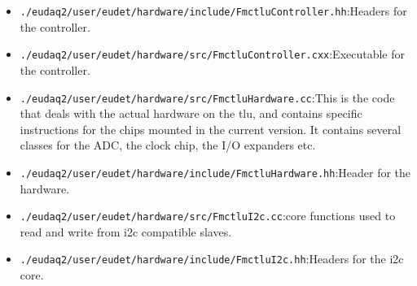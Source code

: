 \begin{itemize}
  \item \verb|./eudaq2/user/eudet/hardware/include/FmctluController.hh|:\newline Headers for the controller.
  \item \verb|./eudaq2/user/eudet/hardware/src/FmctluController.cxx|:\newline Executable for the controller.
  \item \verb|./eudaq2/user/eudet/hardware/src/FmctluHardware.cc|:\newline This is the code that deals with the actual hardware on the \gls{tlu}, and contains specific instructions for the chips mounted in the current version. It contains several classes for the ADC, the clock chip, the I/O expanders etc.
  \item \verb|./eudaq2/user/eudet/hardware/include/FmctluHardware.hh|:\newline Header for the hardware.
  \item \verb|./eudaq2/user/eudet/hardware/src/FmctluI2c.cc|:\newline core functions used to read and write from \gls{i2c} compatible slaves.
  \item \verb|./eudaq2/user/eudet/hardware/include/FmctluI2c.hh|:\newline Headers for the \gls{i2c} core.
\end{itemize}

